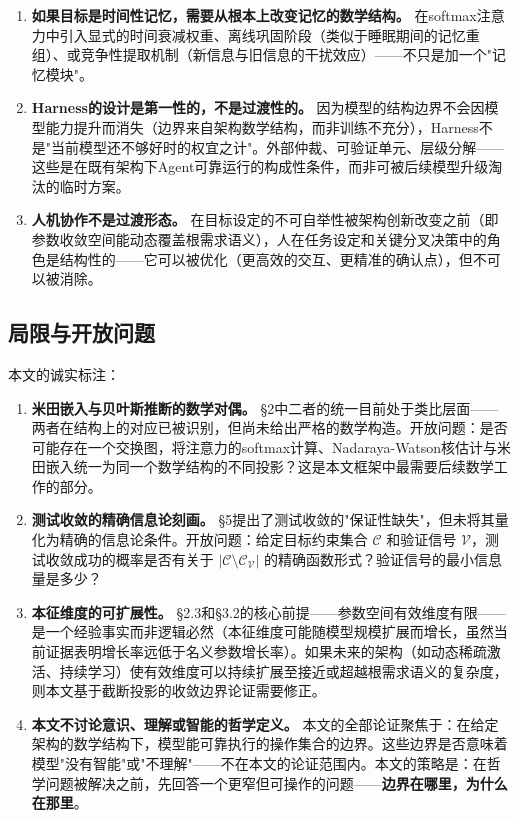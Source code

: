 \documentclass[11pt,a4paper]{ctexart}
\begin{document}
\begin{enumerate}[leftmargin=*]
    \item \textbf{如果目标是时间性记忆，需要从根本上改变记忆的数学结构。} 在softmax注意力中引入显式的时间衰减权重、离线巩固阶段（类似于睡眠期间的记忆重组）、或竞争性提取机制（新信息与旧信息的干扰效应）——不只是加一个"记忆模块"。

    \item \textbf{Harness的设计是第一性的，不是过渡性的。} 因为模型的结构边界不会因模型能力提升而消失（边界来自架构数学结构，而非训练不充分），Harness不是"当前模型还不够好时的权宜之计"。外部仲裁、可验证单元、层级分解——这些是在既有架构下Agent可靠运行的构成性条件，而非可被后续模型升级淘汰的临时方案。

    \item \textbf{人机协作不是过渡形态。} 在目标设定的不可自举性被架构创新改变之前（即参数收敛空间能动态覆盖根需求语义），人在任务设定和关键分叉决策中的角色是结构性的——它可以被优化（更高效的交互、更精准的确认点），但不可以被消除。
\end{enumerate}

\subsection{局限与开放问题}

本文的诚实标注：

\begin{enumerate}[leftmargin=*]
    \item \textbf{米田嵌入与贝叶斯推断的数学对偶。} §2中二者的统一目前处于类比层面——两者在结构上的对应已被识别，但尚未给出严格的数学构造。开放问题：是否可能存在一个交换图，将注意力的softmax计算、Nadaraya-Watson核估计与米田嵌入统一为同一个数学结构的不同投影？这是本文框架中最需要后续数学工作的部分。

    \item \textbf{测试收敛的精确信息论刻画。} §5提出了测试收敛的"保证性缺失"，但未将其量化为精确的信息论条件。开放问题：给定目标约束集合 $\mathcal{C}$ 和验证信号 $\mathcal{V}$，测试收敛成功的概率是否有关于 $|\mathcal{C} \setminus \mathcal{C}_{\mathcal{V}}|$ 的精确函数形式？验证信号的最小信息量是多少？

    \item \textbf{本征维度的可扩展性。} §2.3和§3.2的核心前提——参数空间有效维度有限——是一个经验事实而非逻辑必然（本征维度可能随模型规模扩展而增长，虽然当前证据表明增长率远低于名义参数增长率）。如果未来的架构（如动态稀疏激活、持续学习）使有效维度可以持续扩展至接近或超越根需求语义的复杂度，则本文基于截断投影的收敛边界论证需要修正。

    \item \textbf{本文不讨论意识、理解或智能的哲学定义。} 本文的全部论证聚焦于：在给定架构的数学结构下，模型能可靠执行的操作集合的边界。这些边界是否意味着模型"没有智能"或"不理解"——不在本文的论证范围内。本文的策略是：在哲学问题被解决之前，先回答一个更窄但可操作的问题——\textbf{边界在哪里，为什么在那里}。
\end{enumerate}
\end{document}
